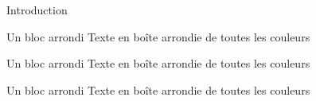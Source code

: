 \begin{frame}{Introduction}

	\begin{beamerboxesrounded} [lower=structure, upper=block title, shadow=true] {Un bloc arrondi}
		 Texte en boîte arrondie de toutes les couleurs
	\end{beamerboxesrounded}
	 
	\begin{block} {Un bloc arrondi}
		Texte en boîte arrondie de toutes les couleurs
	\end{block} 
	 
	\vfill
	\begin{beamerboxesrounded}[scheme=clair, shadow=true] {Un bloc arrondi}
		Texte en boîte arrondie de toutes les couleurs
	\end{beamerboxesrounded}
	
\end{frame}
